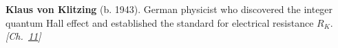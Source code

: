 \nobelphysics \textbf{Klaus von Klitzing} (b. 1943). German physicist who discovered the integer quantum Hall effect and established the standard for electrical resistance $R_K$. \emph{[Ch.~\hyperref[ch:topologicalinsulators]{11}]}

